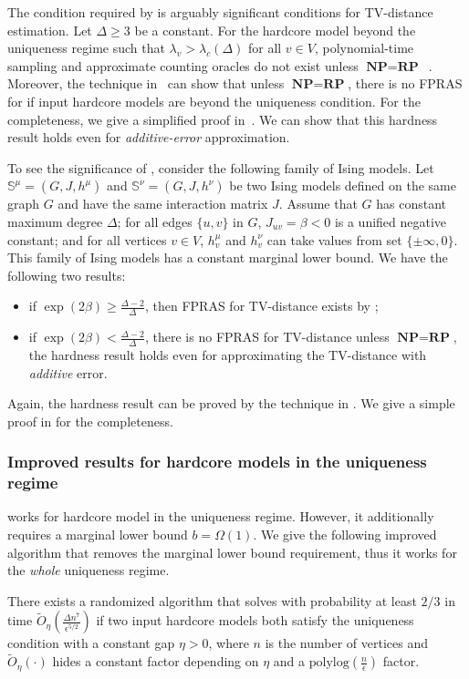 The condition required by  is arguably significant conditions for TV-distance estimation.
Let $\Delta \geq 3$ be a constant.
For the hardcore model beyond the uniqueness regime such that $\lambda_v > \lambda_c(\Delta)$ for all $v \in V$, polynomial-time sampling and approximate counting oracles do not exist unless $\textbf{NP}=\textbf{RP}$~\cite{Sly10}. Moreover, the technique in~\cite{BGMMPV24ICLR} can show that unless $\textbf{NP}=\textbf{RP}$, there is no FPRAS for  if input hardcore models are beyond the uniqueness condition. For the completeness, we give a simplified proof in~. We can show that this hardness result holds even for \emph{additive-error} approximation.


To see the significance of , consider the following family of Ising models.
Let $\mathbb{S}^\mu = (G,J,h^\mu)$ and $\mathbb{S}^\nu = (G,J,h^\nu)$ be two Ising models defined on the same graph $G$ and have the same interaction matrix $J$.
Assume that $G$ has constant maximum degree $\Delta$; 
for all edges $\{u,v\}$ in $G$,
$J_{uv} = \beta < 0$ is a unified negative constant; 
and for all vertices $v \in V$, $h^\mu_v$ and $h^\nu_v$ can take values from set $\{\pm\infty,0\}$. This family of Ising models has a constant marginal lower bound. We have the following two results:
\begin{itemize}
    \item if $\exp(2\beta) \geq \frac{\Delta-2}{\Delta}$, then FPRAS for TV-distance exists by ;
    \item if $\exp(2\beta) < \frac{\Delta-2}{\Delta}$, there is no FPRAS for TV-distance unless $\textbf{NP}=\textbf{RP}$, the hardness result holds even for approximating the TV-distance with \emph{additive} error.
\end{itemize}
Again, the hardness result can be proved by the technique in \cite{BGMMPV24ICLR}. We give a simple proof in  for the completeness.


\subsubsection{Improved results for hardcore models in the uniqueness regime} 

 works for hardcore model in the uniqueness regime. However, it additionally requires a marginal lower bound $b = \Omega(1)$.
We give the following improved algorithm that removes the marginal lower bound requirement, thus it works for the \emph{whole} uniqueness regime.
\begin{theorem}\label{thm:hardcore-1}
 There exists a randomized algorithm that solves  with probability at least $2/3$ in time $\tilde{O}_\eta(\frac{\Delta n^7}{\epsilon^{5/2}})$ if two input hardcore models both satisfy the uniqueness condition with a constant gap $\eta > 0$, where $n$ is the number of vertices and $\tilde{O}_\eta(\cdot)$ hides a constant factor depending on $\eta$ and a $\mathrm{polylog}(\frac{n}{\epsilon})$ factor.
\end{theorem}


